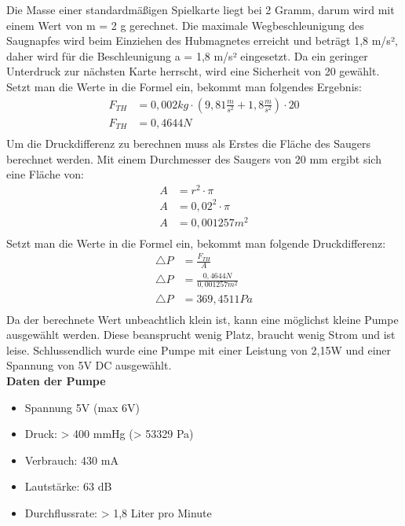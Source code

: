 Die Masse einer standardmäßigen  Spielkarte liegt bei 2 Gramm, darum wird mit einem Wert von m = 2 g gerechnet.
Die maximale Wegbeschleunigung des Saugnapfes wird beim Einziehen des Hubmagnetes erreicht und
beträgt 1,8 m/s²,
daher wird für die Beschleunigung a = 1,8 m/s² eingesetzt. Da ein geringer Unterdruck zur nächsten Karte herrscht, wird eine Sicherheit von 20 gewählt.
Setzt man die Werte in die Formel ein, bekommt man folgendes Ergebnis: \\
\begin{align*}
F_{TH} &= 0,002kg\cdot (9,81\frac{m}{s^{2}}+1,8\frac{m}{s^{2}})\cdot 20\\
F_{TH} &= 0,4644N\\
\end{align*}
Um die Druckdifferenz zu berechnen muss als Erstes die Fläche des Saugers berechnet werden.
Mit einem Durchmesser des Saugers von 20 mm ergibt sich eine Fläche von:
\begin{align*}
A &= r^{2}\cdot \pi\\
A &= 0,02^{2}\cdot \pi\\
A &= 0,001257m^{2}\\
\end{align*}
Setzt man die Werte in die Formel ein, bekommt man folgende Druckdifferenz:
\begin{align*}
\triangle P &= \frac{F_{TH}}{A}\\
\triangle P &= \frac{0,4644N}{0,001257m^{2}}\\
\triangle P &= 369,4511Pa\\
\end{align*}
Da der berechnete Wert unbeachtlich klein ist, kann eine möglichst kleine Pumpe ausgewählt werden. Diese beansprucht
wenig Platz, braucht wenig Strom und ist leise. Schlussendlich wurde eine Pumpe mit einer Leistung von 2,15W und einer
Spannung von 5V DC ausgewählt.\\
\textbf{Daten der Pumpe}
\begin{itemize}
    \item Spannung 5V (max 6V)
    \item Druck: > 400 mmHg (> 53329 Pa)
    \item Verbrauch: 430 mA
    \item Lautstärke: 63 dB
    \item Durchflussrate: > 1,8 Liter pro Minute
\end{itemize}



